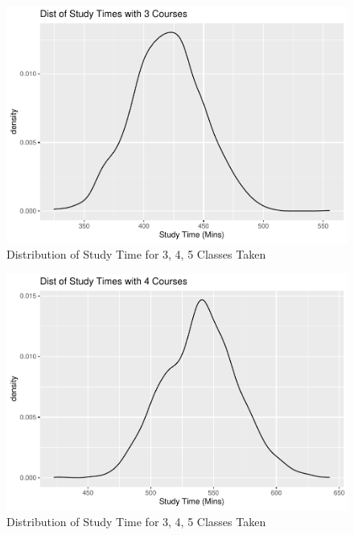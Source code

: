 \documentclass[
]{book}
\newenvironment{Shaded}{\begin{snugshade}}{\end{snugshade}}
\newcommand{\AttributeTok}[1]{\textcolor[rgb]{0.13,0.29,0.53}{#1}}
\newcommand{\DecValTok}[1]{\textcolor[rgb]{0.00,0.00,0.81}{#1}}
\newcommand{\DocumentationTok}[1]{\textcolor[rgb]{0.56,0.35,0.01}{\textbf{\textit{#1}}}}
\newcommand{\FloatTok}[1]{\textcolor[rgb]{0.00,0.00,0.81}{#1}}
\newcommand{\FunctionTok}[1]{\textcolor[rgb]{0.13,0.29,0.53}{\textbf{#1}}}
\newcommand{\NormalTok}[1]{#1}
\newcommand{\OtherTok}[1]{\textcolor[rgb]{0.56,0.35,0.01}{#1}}
\newcommand{\SpecialCharTok}[1]{\textcolor[rgb]{0.81,0.36,0.00}{\textbf{#1}}}
\newcommand{\StringTok}[1]{\textcolor[rgb]{0.31,0.60,0.02}{#1}}
\begin{document}
\begin{figure}
\centering
\includegraphics{bookdown-demo_files/figure-latex/10-conddist3-1.pdf}
\caption{\label{fig:10-conddist3}Distribution of Study Time for 3, 4, 5 Classes Taken}
\end{figure}

\begin{Shaded}
\end{Shaded}

\begin{figure}
\centering
\includegraphics{bookdown-demo_files/figure-latex/10-conddist4-1.pdf}
\caption{\label{fig:10-conddist4}Distribution of Study Time for 3, 4, 5 Classes Taken}
\end{figure}
\end{document}
